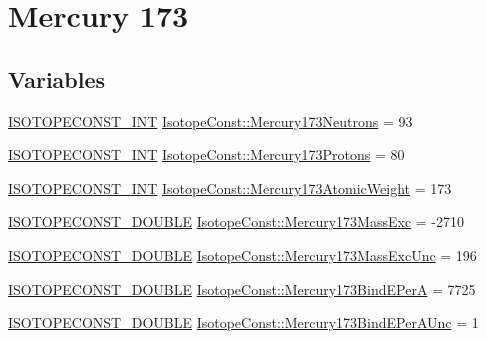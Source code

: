 \hypertarget{group___isotope_const-_mercury-_hg173}{}\section{Mercury 173}
\label{group___isotope_const-_mercury-_hg173}
\subsection*{Variables}
\begin{DoxyCompactItemize}
\item 
\mbox{\hyperlink{group___isotope_const-_macros_ga5f18360b3e99483a35c32d789e62621c}{I\+S\+O\+T\+O\+P\+E\+C\+O\+N\+S\+T\+\_\+\+I\+NT}} \mbox{\hyperlink{group___isotope_const-_mercury-_hg173_ga604187fefb5f712418183260b21b351b}{Isotope\+Const\+::\+Mercury173\+Neutrons}} = 93
\item 
\mbox{\hyperlink{group___isotope_const-_macros_ga5f18360b3e99483a35c32d789e62621c}{I\+S\+O\+T\+O\+P\+E\+C\+O\+N\+S\+T\+\_\+\+I\+NT}} \mbox{\hyperlink{group___isotope_const-_mercury-_hg173_gaafa18abf571d582bdff3f806eeaee8bf}{Isotope\+Const\+::\+Mercury173\+Protons}} = 80
\item 
\mbox{\hyperlink{group___isotope_const-_macros_ga5f18360b3e99483a35c32d789e62621c}{I\+S\+O\+T\+O\+P\+E\+C\+O\+N\+S\+T\+\_\+\+I\+NT}} \mbox{\hyperlink{group___isotope_const-_mercury-_hg173_ga41c07053854d81bc3b94c80c9c145711}{Isotope\+Const\+::\+Mercury173\+Atomic\+Weight}} = 173
\item 
\mbox{\hyperlink{group___isotope_const-_macros_ga8f45a7272ce02c0b4c65c44636ed719a}{I\+S\+O\+T\+O\+P\+E\+C\+O\+N\+S\+T\+\_\+\+D\+O\+U\+B\+LE}} \mbox{\hyperlink{group___isotope_const-_mercury-_hg173_gae4c6f08b821379815966a0d0b54cb250}{Isotope\+Const\+::\+Mercury173\+Mass\+Exc}} = -\/2710
\item 
\mbox{\hyperlink{group___isotope_const-_macros_ga8f45a7272ce02c0b4c65c44636ed719a}{I\+S\+O\+T\+O\+P\+E\+C\+O\+N\+S\+T\+\_\+\+D\+O\+U\+B\+LE}} \mbox{\hyperlink{group___isotope_const-_mercury-_hg173_ga12df6aa3b60737bdbf558b81870a3588}{Isotope\+Const\+::\+Mercury173\+Mass\+Exc\+Unc}} = 196
\item 
\mbox{\hyperlink{group___isotope_const-_macros_ga8f45a7272ce02c0b4c65c44636ed719a}{I\+S\+O\+T\+O\+P\+E\+C\+O\+N\+S\+T\+\_\+\+D\+O\+U\+B\+LE}} \mbox{\hyperlink{group___isotope_const-_mercury-_hg173_ga90002a053182adcb5093d145ebd01b97}{Isotope\+Const\+::\+Mercury173\+Bind\+E\+PerA}} = 7725
\item 
\mbox{\hyperlink{group___isotope_const-_macros_ga8f45a7272ce02c0b4c65c44636ed719a}{I\+S\+O\+T\+O\+P\+E\+C\+O\+N\+S\+T\+\_\+\+D\+O\+U\+B\+LE}} \mbox{\hyperlink{group___isotope_const-_mercury-_hg173_gad73fd5dd0500470cf66a10ca6b0c79d1}{Isotope\+Const\+::\+Mercury173\+Bind\+E\+Per\+A\+Unc}} = 1

\end{DoxyCompactItemize}
